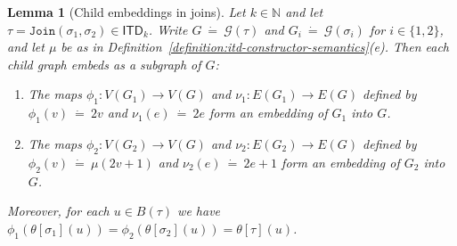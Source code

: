 \documentclass[11pt,a4paper]{article}
\newtheorem{lemma}[theorem]{Lemma}
\newcommand{\treewidthvalue}{k}
\newcommand{\decompositiongraph}[1]{\mathcal{G}(#1)}
\newcommand{\N}{\mathbb{N}}
\newcommand{\vertexset}[1]{V(#1)}
\newcommand{\edgeset}[1]{E(#1)}
\newcommand{\jointype}{\mathtt{Join}}
\newcommand{\topbagname}{B}
\newcommand{\topbag}[1]{\topbagname(#1)}
\newcommand{\allabstractdecompositionstreewidth}[1]{\mathsf{ITD}_{#1}}
\newcommand{\abstractdecomposition}{\tau}
\newcommand{\sigmaabstractdecomposition}{\sigma}
\newcommand{\defeq}{~\dot{=}~}
\newcommand{\topmapname}{\theta}
\newcommand{\topmap}[1]{\topmapname[#1]}
\begin{document}
\begin{lemma}[Child embeddings in joins]
\label{lemma:join-child-embeddings}
Let $\treewidthvalue\in \N$ and let $\abstractdecomposition=\jointype(\sigmaabstractdecomposition_1,\sigmaabstractdecomposition_2)\in \allabstractdecompositionstreewidth{\treewidthvalue}$.
Write $G\defeq \decompositiongraph{\abstractdecomposition}$ and $G_i\defeq \decompositiongraph{\sigmaabstractdecomposition_i}$ for $i\in\{1,2\}$, and let $\mu$ be as in Definition~\ref{definition:itd-constructor-semantics}(e).
Then each child graph embeds as a subgraph of $G$:
\begin{enumerate}
\item The maps $\phi_1:\vertexset{G_1}\to \vertexset{G}$ and $\nu_1:\edgeset{G_1}\to \edgeset{G}$ defined by $\phi_1(v)\defeq 2v$ and $\nu_1(e)\defeq 2e$ form an embedding of $G_1$ into $G$.
\item The maps $\phi_2:\vertexset{G_2}\to \vertexset{G}$ and $\nu_2:\edgeset{G_2}\to \edgeset{G}$ defined by $\phi_2(v)\defeq \mu(2v+1)$ and $\nu_2(e)\defeq 2e+1$ form an embedding of $G_2$ into $G$.
\end{enumerate}
Moreover, for each $u\in \topbag{\abstractdecomposition}$ we have $\phi_1(\topmap{\sigmaabstractdecomposition_1}(u))=\phi_2(\topmap{\sigmaabstractdecomposition_2}(u))=\topmap{\abstractdecomposition}(u)$.
\end{lemma}
\end{document}
